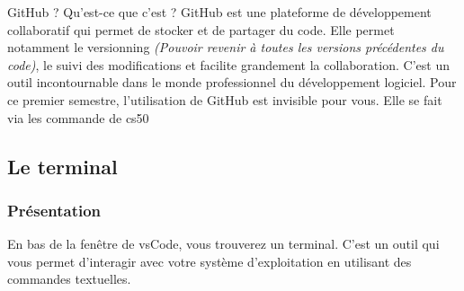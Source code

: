 \begin{UPSTIinfor}{GitHub ? Qu'est-ce que c'est ?}
	GitHub est une plateforme de développement collaboratif qui permet de stocker et de partager du code.
	Elle permet notamment le versionning \textit{(Pouvoir revenir à toutes les versions précédentes du code)}, le suivi des modifications et facilite grandement la collaboration.
	C'est un outil incontournable dans le monde professionnel du développement logiciel.
	Pour ce premier semestre, l'utilisation de GitHub est invisible pour vous. Elle se fait via les commande de cs50
\end{UPSTIinfor}

\subsection{Le terminal}

\subsubsection{Présentation}

En bas de la fenêtre de vsCode, vous trouverez un terminal. C'est un outil qui vous permet d'interagir avec votre système d'exploitation en utilisant des commandes textuelles.

